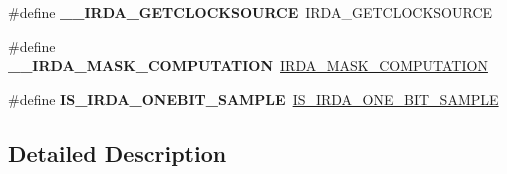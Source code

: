 \begin{DoxyCompactItemize}
\#define {\bfseries \+\_\+\+\_\+\+I\+R\+D\+A\+\_\+\+G\+E\+T\+C\+L\+O\+C\+K\+S\+O\+U\+R\+CE}~I\+R\+D\+A\+\_\+\+G\+E\+T\+C\+L\+O\+C\+K\+S\+O\+U\+R\+CE
\item 
\mbox{\label{group___h_a_l___i_r_d_a___aliased___macros_gaf50dbfc5425aee78a33582322b187616}} 
\#define {\bfseries \+\_\+\+\_\+\+I\+R\+D\+A\+\_\+\+M\+A\+S\+K\+\_\+\+C\+O\+M\+P\+U\+T\+A\+T\+I\+ON}~\hyperlink{group___i_r_d_a_ex___private___macros_gab905bc46038b12561969148fa4929888}{I\+R\+D\+A\+\_\+\+M\+A\+S\+K\+\_\+\+C\+O\+M\+P\+U\+T\+A\+T\+I\+ON}
\item 
\mbox{\label{group___h_a_l___i_r_d_a___aliased___macros_ga152f6e8c07efa028364631d5eab0f9ed}} 
\#define {\bfseries I\+S\+\_\+\+I\+R\+D\+A\+\_\+\+O\+N\+E\+B\+I\+T\+\_\+\+S\+A\+M\+P\+LE}~\hyperlink{group___i_r_d_a___private___macros_ga6bb7d320c0f8800d4cb5750cf24bf760}{I\+S\+\_\+\+I\+R\+D\+A\+\_\+\+O\+N\+E\+\_\+\+B\+I\+T\+\_\+\+S\+A\+M\+P\+LE}
\end{DoxyCompactItemize}


\subsection{Detailed Description}
